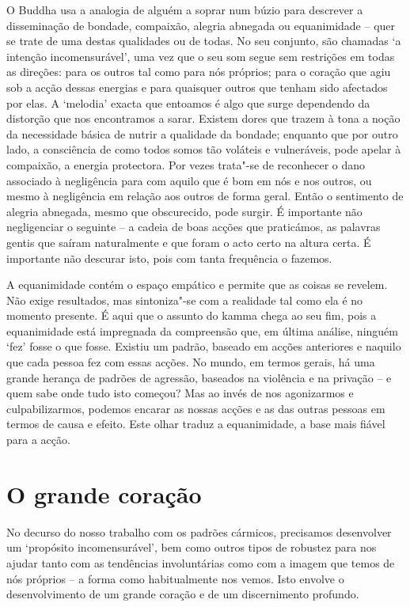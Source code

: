 O Buddha usa a analogia de alguém a soprar num búzio para descrever a
disseminação de bondade, compaixão, alegria abnegada ou equanimidade -- quer se
trate de uma destas qualidades ou de todas. No seu conjunto,
são chamadas `a intenção incomensurável', uma vez que o seu som segue sem
restrições em todas as direções: para os outros tal como para nós próprios; para
o coração que agiu sob a acção dessas energias e para quaisquer outros que
tenham sido afectados por elas. A `melodia' exacta que entoamos é algo que surge
dependendo da distorção que nos encontramos a sarar. Existem dores que trazem à
tona a noção da necessidade básica de nutrir a qualidade da bondade; enquanto
que por outro lado, a consciência de como todos somos tão voláteis e
vulneráveis, pode apelar à compaixão, a energia protectora. Por vezes trata"-se
de reconhecer o dano associado à negligência para com aquilo que é bom em nós e
nos outros, ou mesmo à negligência em relação aos outros de forma geral. Então o
sentimento de alegria abnegada, mesmo que obscurecido, pode surgir. É importante
não negligenciar o seguinte -- a cadeia de boas acções que praticámos, as
palavras gentis que saíram naturalmente e que foram o acto certo na altura
certa. É importante não descurar isto, pois com tanta frequência o fazemos.

A equanimidade contém o espaço empático e permite que as coisas se revelem. Não
exige resultados, mas sintoniza"-se com a realidade tal como ela é no momento
presente. É aqui que o assunto do kamma chega ao seu fim, pois a equanimidade
está impregnada da compreensão que, em última análise, ninguém `fez' fosse o que
fosse. Existiu um padrão, baseado em acções anteriores e naquilo que cada pessoa
fez com essas acções. No mundo, em termos gerais, há uma grande herança de
padrões de agressão, baseados na violência e na privação -- e quem sabe onde
tudo isto começou? Mas ao invés de nos agonizarmos e culpabilizarmos, podemos
encarar as nossas acções e as das outras pessoas em termos de causa e efeito.
Este olhar traduz a equanimidade, a base mais fiável para a acção.

\section{O grande coração}

No decurso do nosso trabalho com os padrões cármicos, precisamos desenvolver um
`propósito incomensurável', bem como outros tipos de robustez para nos ajudar
tanto com as tendências involuntárias como com a imagem que temos de nós
próprios -- a forma como habitualmente nos vemos. Isto envolve o desenvolvimento
de um grande coração e de um discernimento profundo.

